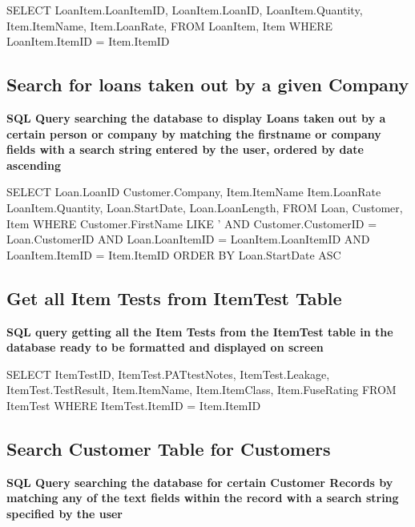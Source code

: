 \begin{sql}
    SELECT
    LoanItem.LoanItemID,
    LoanItem.LoanID,
    LoanItem.Quantity,
    Item.ItemName,
    Item.LoanRate,
    FROM LoanItem, Item
    WHERE LoanItem.ItemID = Item.ItemID
\end{sql}

\newpage

\subsection{Search for loans taken out by a given Company}

\textbf{SQL Query searching the database to display Loans taken out by a certain person or company by matching the firstname or company fields with a search string entered by the user, ordered by date ascending}

\begin{sql}
    SELECT
    Loan.LoanID
    Customer.Company,
    Item.ItemName
    Item.LoanRate
    LoanItem.Quantity,
    Loan.StartDate,
    Loan.LoanLength,
    FROM Loan, Customer, Item
    WHERE Customer.FirstName LIKE '%
    AND Customer.CustomerID = Loan.CustomerID AND Loan.LoanItemID = LoanItem.LoanItemID AND LoanItem.ItemID = Item.ItemID
    ORDER BY Loan.StartDate ASC
\end{sql}

\subsection{Get all Item Tests from ItemTest Table}

\textbf{SQL query getting all the Item Tests from the ItemTest table in the database ready to be formatted and displayed on screen}

\begin{sql}
      SELECT
      ItemTestID, 
      ItemTest.PATtestNotes,
      ItemTest.Leakage,
      ItemTest.TestResult,
      Item.ItemName,
      Item.ItemClass,
      Item.FuseRating
      FROM ItemTest
      WHERE ItemTest.ItemID = Item.ItemID
\end{sql}


\subsection{Search Customer Table for Customers}

\textbf{SQL Query searching the database for certain Customer Records by matching any of the text fields within the record with a search string specified by the user}

